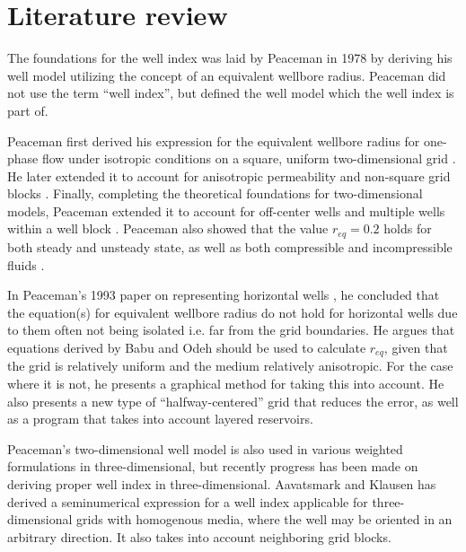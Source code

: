 
\section{Literature review} %
\label{sec:literature_review}
The foundations for the well index was laid by Peaceman in 1978 \cite{Aavatsmark2003Well} by deriving his well model utilizing the concept of an equivalent wellbore radius. Peaceman did not use the term ``well index'', but defined the well model which the well index is part of.

Peaceman first derived his expression for the equivalent wellbore radius for one-phase flow under isotropic conditions on a square, uniform two-dimensional grid \cite{Peaceman1978Interpretation}. He later extended it to account for anisotropic permeability and non-square grid blocks \cite{Peaceman1983Interpretation}. Finally, completing the theoretical foundations for two-dimensional models, Peaceman extended it to account for off-center wells and multiple wells within a well block \cite{Peaceman1990Interpretation}. Peaceman also showed that the value $r_{eq}=0.2$ holds for both steady and unsteady state, as well as both compressible and incompressible fluids \cite{Peaceman1978Interpretation}.

In Peaceman's 1993 paper on representing horizontal wells \cite{Peaceman1993Representation}, he concluded that the equation(s) for equivalent wellbore radius do not hold for horizontal wells due to them often not being isolated i.e. far from the grid boundaries. He argues that equations derived by Babu and Odeh \cite{Babu1991Relation} should be used to calculate $r_{eq}$, given that the grid is relatively uniform and the medium relatively anisotropic. For the case where it is not, he presents a graphical method for taking this into account. He also presents a new type of ``halfway-centered'' grid that reduces the error, as well as a program that takes into account layered reservoirs.

Peaceman's two-dimensional well model is also used in various weighted formulations in three-dimensional, but recently progress has been made on deriving proper well index in three-dimensional. Aavatsmark and Klausen has derived a seminumerical expression for a well index applicable for three-dimensional grids with homogenous media, where the well may be oriented in an arbitrary direction. It also takes into account neighboring grid blocks. \cite{Aavatsmark2003Well}


